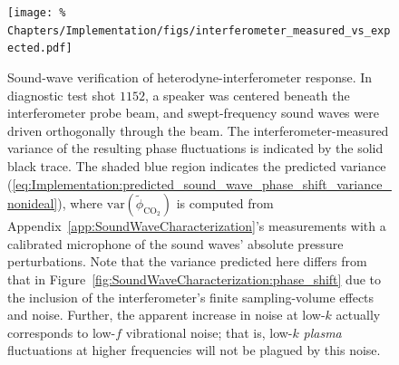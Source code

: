 \begin{figure}
  \centering
  \texttt{[image: \%
    Chapters/Implementation/figs/interferometer\_measured\_vs\_expected.pdf]}
  \caption[Sound-wave verification of heterodyne-interferometer response]{%
    Sound-wave verification of heterodyne-interferometer response.
    In diagnostic test shot $1152$,
    a speaker was centered beneath the interferometer probe beam, and
    swept-frequency sound waves were driven orthogonally through the beam.
    The interferometer-measured variance of the resulting phase fluctuations
    is indicated by the solid black trace.
    The shaded blue region indicates the predicted variance
    (\ref{eq:Implementation:predicted_sound_wave_phase_shift_variance_nonideal}),
    where $\text{var}(\tilde{\phi}_{\text{CO}_2})$
    is computed from Appendix~\ref{app:SoundWaveCharacterization}'s
    measurements with a calibrated microphone
    of the sound waves' absolute pressure perturbations.
    Note that the variance predicted here differs from that in
    Figure~\ref{fig:SoundWaveCharacterization:phase_shift}
    due to the inclusion of the interferometer's
    finite sampling-volume effects and noise.
    Further, the apparent increase in noise at low-$k$
    actually corresponds to low-$f$ vibrational noise;
    that is, low-$k$ \emph{plasma} fluctuations
    at higher frequencies will not be plagued by this noise.
  }
\label{fig:Implementation:interferometer_measured_vs_expected}
\end{figure}

